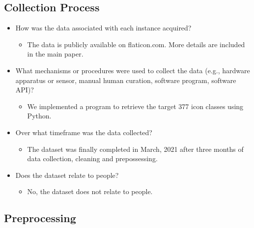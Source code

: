 \documentclass{article}
\begin{document}
\subsection{Collection Process}
\begin{itemize}
    \item How was the data associated with each instance acquired?
    \begin{itemize}
        \item The data is publicly available on flaticon.com. More details are included in the main paper.
    \end{itemize}
    \item What mechanisms or procedures were used to collect the data
(e.g., hardware apparatus or sensor, manual human curation, software program, software API)?
    \begin{itemize}
        \item We implemented a program to retrieve the target 377 icon classes using Python.
\end{itemize}
    \item Over what timeframe was the data collected?
    \begin{itemize}
        \item The dataset was finally completed in March, 2021 after three months of data collection, cleaning and prepossessing.
    \end{itemize}
    \item Does the dataset relate to people?
    \begin{itemize}
        \item No, the dataset does not relate to people.
    \end{itemize}
\end{itemize}

\subsection{Preprocessing}
\end{document}
